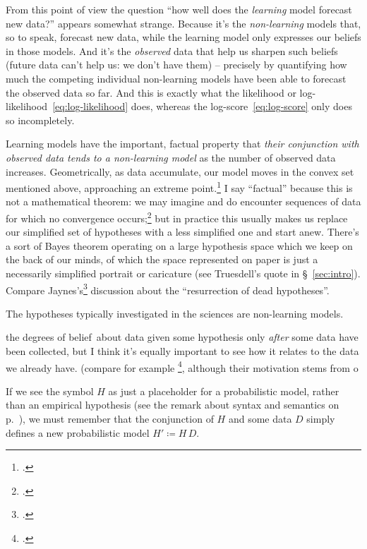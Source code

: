 \documentclass[\ifafour a4paper,12pt,\else a5paper,10pt,\fi%
onecolumn,oneside,article,%
british%
]{memoir}
\theoremstyle{remark}
\theoremstyle{innote}
\newcommand*{\citep}{\footcites}
\newcommand*{\defd}{\coloneqq}
\renewcommand*{\|}[1][]{\nonscript\:#1\vert\nonscript\:\mathopen{}}
\renewcommand*{\=}{\TextOrMath\texteq\eq}
\newcommand*{\sect}{\S}%
\newcommand*{\chap}{ch.}%
\newcommand*{\eg}{{e.g.}}
\newcommand*{\dobs}{degrees of belief}
\begin{document}
From this point of view the question \enquote{how well does the
  \emph{learning} model forecast new data?} appears somewhat strange.
Because it's the \emph{non-learning} models that, so to speak, forecast new
data, while the learning model only expresses our beliefs in those models.
And it's the \emph{observed} data that help us sharpen such beliefs (future
data can't help us: we don't have them) -- precisely by quantifying how
much the competing individual non-learning models have been able to
forecast the observed data so far. And this is exactly what the likelihood or
log-likelihood~\eqref{eq:log-likelihood} does, whereas the
log-score~\eqref{eq:log-score} only does so incompletely.



Learning models have the important, factual
property that \emph{their conjunction with observed data tends to a
  non-learning model} as the number of observed data increases.
Geometrically, as data accumulate, our model moves in the convex set
mentioned above, approaching an extreme point.\citep[compare Hjort
in][p.~50]{barronetal1986}[\chap~3]{hjort1986} I say \enquote{factual}
because this is not a mathematical theorem: we may imagine and do encounter
sequences of data for which no convergence occurs;\citep[see
\eg][]{bruno1964,berk1966,berk1970}[also][\sect~3]{diaconis1988} but in
practice this usually makes us replace our simplified set of hypotheses
with a less simplified one and start anew. There's a sort of Bayes theorem
operating on a large hypothesis space which we keep on the back of our
minds, of which the space represented on paper is just a necessarily
simplified portrait or caricature (see Truesdell's quote in
\sect~\ref{sec:intro}). Compare
Jaynes's\citep[\sect~4.4.1]{jaynes1994_r2003} discussion about the
\enquote{resurrection of dead hypotheses}.

The hypotheses typically investigated in the sciences are non-learning models.


the \dobs\ about data given some
hypothesis only \emph{after} some data have been collected, but I think
it's equally important to see how it relates to the data we already have.
(compare for example \citep{ohagan1995,bergeretal1996,bergeretal1998},
although their motivation stems from o

If we see the symbol $H$ as just a placeholder for a probabilistic model,
rather than an empirical hypothesis (see the remark about syntax and
semantics on p.~\pageref{note:syntax}), we must remember that the
conjunction of $H$ and some data $D$ simply defines a new probabilistic
model $H' \defd H \, D$.
\end{document}
